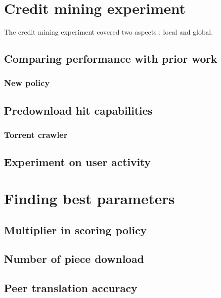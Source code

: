 \section{Credit mining experiment}
\label{section:cmexp}
The credit mining experiment covered two aspects : local and global. 

\subsection{Comparing performance with prior work}
\subsubsection{New policy}
\subsection{Predownload hit capabilities}
\subsubsection{Torrent crawler}
\subsection{Experiment on user activity}

\section{Finding best parameters}
\label{section:cmparamexp}
\subsection{Multiplier in scoring policy}
\subsection{Number of piece download}
\subsection{Peer translation accuracy}



